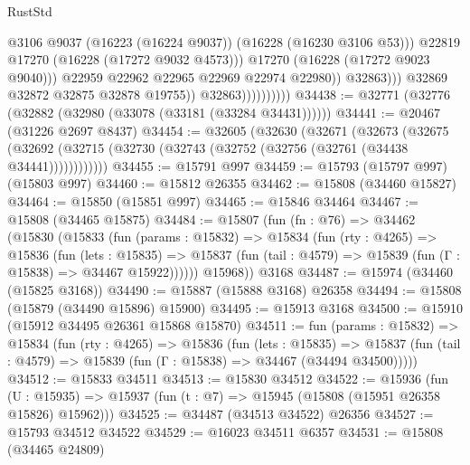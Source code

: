 \begin{lexlean}{RustStd}
\begin{coremodule}
                                            @3106
                                            @9037
                                            (@16223 (@16224 @9037))
                                            (@16228 (@16230 @3106 @53)))
                                          @22819
                                          @17270
                                          (@16228 (@17272 @9032 @4573)))
                                        @17270
                                        (@16228 (@17272 @9023 @9040)))
                                      @22959
                                      @22962
                                      @22965
                                      @22969
                                      @22974
                                      @22980))
                                  @32863)))
                            @32869
                            @32872
                            @32875
                            @32878
                            @19755))
                        @32863))))))))))
@34438 := @32771 (@32776 (@32882 (@32980 (@33078 (@33181 (@33284 @34431))))))
@34441 := @20467 (@31226 @2697 @8437)
@34454 := @32605
    (@32630
      (@32671
        (@32673
          (@32675 (@32692 (@32715 (@32730 (@32743 (@32752 (@32756 (@32761 (@34438 @34441))))))))))))
@34455 := @15791 @997
@34459 := @15793 (@15797 @997) (@15803 @997)
@34460 := @15812 @26355
@34462 := @15808 (@34460 @15827)
@34464 := @15850 (@15851 @997)
@34465 := @15846 @34464
@34467 := @15808 (@34465 @15875)
@34484 := @15807
    (fun (fn : @76) =>
    @34462
      (@15830
        (@15833
          (fun (params : @15832) =>
          @15834
            (fun (rty : @4265) =>
            @15836
              (fun (lets : @15835) =>
              @15837 (fun (tail : @4579) => @15839 (fun (Γ : @15838) => @34467 @15922))))))
        @15968))
    @3168
@34487 := @15974 (@34460 (@15825 @3168))
@34490 := @15887 (@15888 @3168) @26358
@34494 := @15808 (@15879 (@34490 @15896) @15900)
@34495 := @15913 @3168
@34500 := @15910 (@15912 @34495 @26361 @15868 @15870)
@34511 := fun (params : @15832) =>
  @15834
    (fun (rty : @4265) =>
    @15836
      (fun (lets : @15835) =>
      @15837 (fun (tail : @4579) => @15839 (fun (Γ : @15838) => @34467 (@34494 @34500)))))
@34512 := @15833 @34511
@34513 := @15830 @34512
@34522 := @15936
    (fun (U : @15935) => @15937 (fun (t : @7) => @15945 (@15808 (@15951 @26358 @15826) @15962)))
@34525 := @34487 (@34513 @34522) @26356
@34527 := @15793 @34512 @34522
@34529 := @16023 @34511 @6357
@34531 := @15808 (@34465 @24809)

\end{coremodule}
\end{lexlean}
